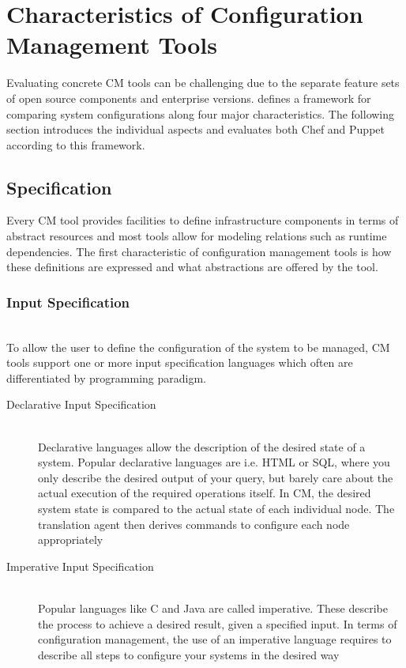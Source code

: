 \section{Characteristics of Configuration Management Tools}

Evaluating concrete CM tools can be challenging due to the separate feature sets of open source components and enterprise versions. \cite{delaet2010survey} defines a framework for comparing system configurations along four major characteristics. The following section introduces the individual aspects and evaluates both Chef and Puppet according to this framework.

\subsection{Specification}

Every CM tool provides facilities to define infrastructure components in terms of abstract resources and most tools allow for modeling relations such as runtime dependencies. The first characteristic of configuration management tools is how these definitions are expressed and what abstractions are offered by the tool.

\subsubsection{Input Specification}\hfill\\

To allow the user to define the configuration of the system to be managed, CM tools support one or more input specification languages which often are differentiated by programming paradigm.

\begin{description}
	\item [Declarative Input Specification] \hfill \\
	Declarative languages allow the description of the desired state of a system. Popular declarative languages are i.e. HTML or SQL, where you only describe the desired output of your query, but barely care about the actual execution of the required operations itself. In CM, the desired system state is compared to the actual state of each individual node. The translation agent then derives commands to configure each node appropriately \cite{delaet2010survey}
	\item [Imperative Input Specification] \hfill \\
	Popular languages like C and Java are called imperative. These describe the process to achieve a desired result, given a specified input. In terms of configuration management, the use of an imperative language requires to describe all steps to configure your systems in the desired way  
\end{description}

